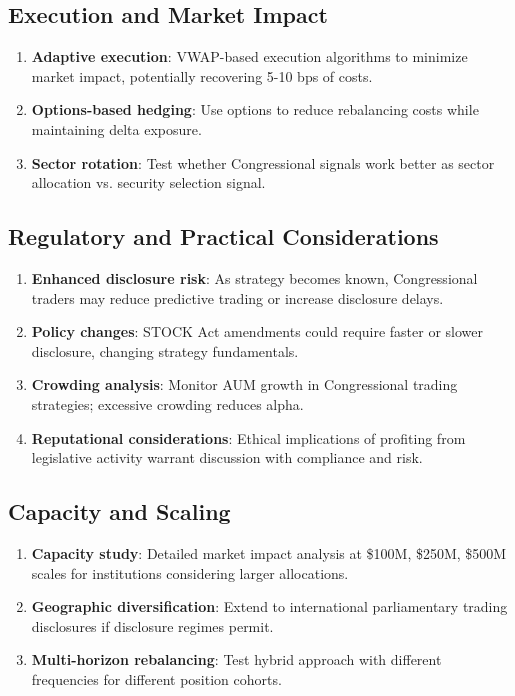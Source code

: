 \documentclass[twocolumn,ieee]{Base_Latex_Template/arithmaxresearch}
\begin{document}
\subsection{Execution and Market Impact}

\begin{enumerate}
\item \textbf{Adaptive execution}: VWAP-based execution algorithms to minimize market impact, potentially recovering 5-10 bps of costs.

\item \textbf{Options-based hedging}: Use options to reduce rebalancing costs while maintaining delta exposure.

\item \textbf{Sector rotation}: Test whether Congressional signals work better as sector allocation vs. security selection signal.
\end{enumerate}

\subsection{Regulatory and Practical Considerations}

\begin{enumerate}
\item \textbf{Enhanced disclosure risk}: As strategy becomes known, Congressional traders may reduce predictive trading or increase disclosure delays.

\item \textbf{Policy changes}: STOCK Act amendments could require faster or slower disclosure, changing strategy fundamentals.

\item \textbf{Crowding analysis}: Monitor AUM growth in Congressional trading strategies; excessive crowding reduces alpha.

\item \textbf{Reputational considerations}: Ethical implications of profiting from legislative activity warrant discussion with compliance and risk.
\end{enumerate}

\subsection{Capacity and Scaling}

\begin{enumerate}
\item \textbf{Capacity study}: Detailed market impact analysis at \$100M, \$250M, \$500M scales for institutions considering larger allocations.

\item \textbf{Geographic diversification}: Extend to international parliamentary trading disclosures if disclosure regimes permit.

\item \textbf{Multi-horizon rebalancing}: Test hybrid approach with different frequencies for different position cohorts.
\end{enumerate}
\end{document}
